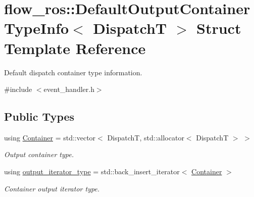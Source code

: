 \hypertarget{structflow__ros_1_1_default_output_container_type_info}{}\section{flow\+\_\+ros\+:\+:Default\+Output\+Container\+Type\+Info$<$ DispatchT $>$ Struct Template Reference}
\label{structflow__ros_1_1_default_output_container_type_info}


Default dispatch container type information.  




{\ttfamily \#include $<$event\+\_\+handler.\+h$>$}

\subsection*{Public Types}
\begin{DoxyCompactItemize}
\item 
\mbox{\label{structflow__ros_1_1_default_output_container_type_info_a4ffbb4d1e03977b064edda2072187299}} 
using \hyperlink{structflow__ros_1_1_default_output_container_type_info_a4ffbb4d1e03977b064edda2072187299}{Container} = std\+::vector$<$ DispatchT, std\+::allocator$<$ DispatchT $>$ $>$
\begin{DoxyCompactList}\small\item\em Output container type. \end{DoxyCompactList}\item 
\mbox{\label{structflow__ros_1_1_default_output_container_type_info_a8fcd2ae4f8d0f4fb411b6a433b40d5f2}} 
using \hyperlink{structflow__ros_1_1_default_output_container_type_info_a8fcd2ae4f8d0f4fb411b6a433b40d5f2}{output\+\_\+iterator\+\_\+type} = std\+::back\+\_\+insert\+\_\+iterator$<$ \hyperlink{structflow__ros_1_1_default_output_container_type_info_a4ffbb4d1e03977b064edda2072187299}{Container} $>$
\begin{DoxyCompactList}\small\item\em Container output iterator type. \end{DoxyCompactList}\end{DoxyCompactItemize}
